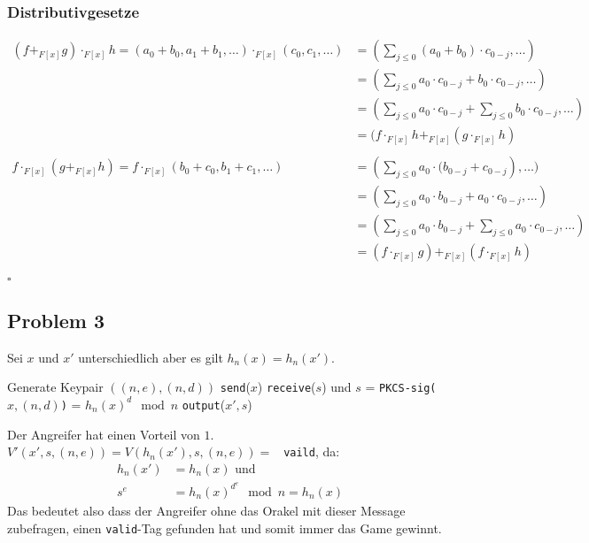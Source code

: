 \documentclass[12pt, german]{article}
\newcommand{\bewiesen}{\begin{flushright}$\square$ \end{flushright} }
\begin{document}
\begin{enumerate}[label=\alph*)]
   	\subsubsection*{Distributivgesetze}
    \begin{align*}
  (f +_{F[x]} g) \cdot_{F[x]} h = (a_0+b_0,a_1+b_1,\ldots) \cdot_{F[x]} (c_0,c_1,\ldots) 
  &= (\sum_{j\leq 0}{(a_0+b_0)\cdot c_{0-j}},\ldots) \\
  &=(\sum_{j\leq 0}{a_0 \cdot c_{0-j} +b_0\cdot c_{0-j}},\ldots) \\ 
  &= (\sum_{j\leq 0}{a_0 \cdot c_{0-j}} +\sum_{j\leq 0}{b_0\cdot c_{0-j}},\ldots) \\ 
  &= (f \cdot_{F[x]} h +_{F[x]}(g \cdot_{F[x]} h)
    \\
    \\
    	f \cdot_{F[x]} (g +_{F[x]}h) = f \cdot_{F[x]}(b_0+c_0,b_1+c_1,\ldots)
    	&=(\sum_{j\leq 0}{a_0 \cdot (b_{0-j}+c_{0-j}}),\ldots) \\
    	&=(\sum_{j\leq 0}{a_0 \cdot b_{0-j}+a_0 \cdot c_{0-j}}, \ldots) \\
    	&= (\sum_{j\leq 0}{a_0 \cdot b_{0-j}+ \sum_{j\leq 0}a_0 \cdot c_{0-j}},\ldots) \\
    	&=(f \cdot_{F[x]} g)+_{F[x]}(f \cdot_{F[x]}h)
    \end{align*}
   \bewiesen

  \end{enumerate}
    \newpage
     \subsection*{Problem 3}
     Sei $x$ und $x'$ unterschiedlich aber es gilt $h_n(x) = h_n(x')$. 
      \begin{algorithm} 
     	\centering
     	\caption{ }
     	\label{Alg:1}
     	\begin{algorithmic}[1]
     		\State Generate Keypair $((n,e),(n,d))$
     		\State \texttt{send}($x$)
     		\State \texttt{receive}($s$) und  $s$ = \texttt{PKCS-sig($x, (n,d)$)} = $h_n(x)^d\mod n$
     		\State \texttt{output}($x', s$)
     	\end{algorithmic}
       \end{algorithm}
   	
   	\noindent
   	Der Angreifer hat einen Vorteil von $1$. \\
   	$V'(x', s,(n,e)) = V(h_n(x'), s, (n,e)) = $ \texttt{ vaild}, da: 
   	\begin{align*}
   		h_n(x') &= h_n(x) \text{ und }\\
   		s^e &= h_n(x)^{d^{e}} \mod n = h_n(x)
   	\end{align*}
   	Das bedeutet also dass der Angreifer ohne das Orakel mit dieser Message zubefragen, einen \texttt{valid}-Tag gefunden hat und somit immer das Game gewinnt.
    \newpage
\end{document}
